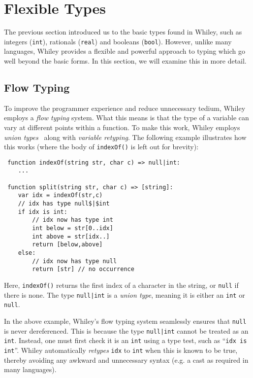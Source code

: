 \newpage
\section{Flexible Types}
The previous section introduced us to the basic types found in Whiley,
such as integers (\lstinline{int}), rationals (\lstinline{real}) and
booleans (\lstinline{bool}).  However, unlike many languages, Whiley
provides a flexible and powerful approach to typing which go well
beyond the basic forms.  In this section, we will examine this in more
detail.

\subsection{Flow Typing}
To improve the programmer experience and reduce unnecessary tedium,
Whiley employs a {\em flow typing} system.  What this means is that
the type of a variable can vary at different points within a function.
To make this work, Whiley employs {\em union types}~\cite{BC91,IN07} along with {\em variable retyping}.  The
following example illustrates how this works (where the body of
\lstinline{indexOf()} is left out for brevity):

\begin{lstlisting}
 function indexOf(string str, char c) => null|int:
    ...

 function split(string str, char c) => [string]:
    var idx = indexOf(str,c)
    // idx has type null$|$int
    if idx is int:
        // idx now has type int
        int below = str[0..idx]
        int above = str[idx..]
        return [below,above]
    else:
        // idx now has type null
        return [str] // no occurrence
\end{lstlisting}
Here, \lstinline{indexOf()} returns the first index of a character in
the string, or \lstinline{null} if there is none.  The type
\lstinline{null|int} is a {\em union type}, meaning it is either an
\lstinline{int} or \lstinline{null}.

In the above example, Whiley's flow typing system seamlessly ensures
that \lstinline{null} is never dereferenced.  This is because the type
\lstinline{null|int} cannot be treated as an \lstinline{int}.
Instead, one must first check it is an \lstinline{int} using a type
test, such as ``\lstinline{idx is int}''.  Whiley automatically
{\em retypes} \lstinline{idx} to \lstinline{int} when this is known to be
true, thereby avoiding any awkward and unnecessary syntax (e.g. a cast
as required in many languages).

